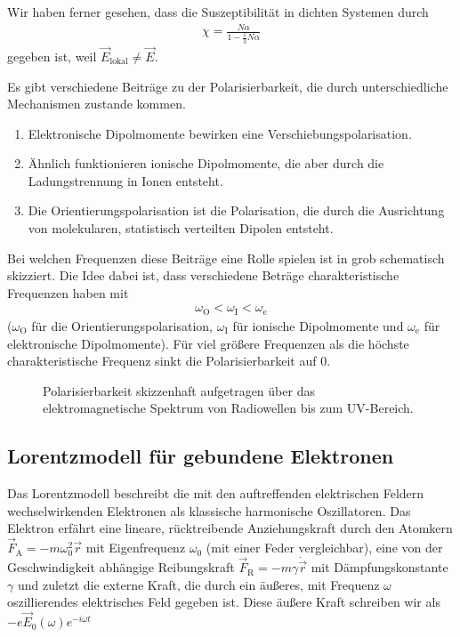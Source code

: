 Wir haben ferner gesehen, dass die Suszeptibilität in dichten Systemen durch
\begin{align*}
    \chi =\frac{N\alpha}{1-\frac{1}{3}N\alpha}
\end{align*}
gegeben ist, weil $\vec E_\mathrm{lokal}\neq\vec E$.

Es gibt verschiedene Beiträge zu der Polarisierbarkeit, die durch unterschiedliche Mechanismen zustande kommen.
\begin{enumerate}
    \item Elektronische Dipolmomente bewirken eine Verschiebungspolarisation.
    \item Ähnlich funktionieren ionische Dipolmomente, die aber durch die Ladungstrennung in Ionen entsteht.
    \item Die Orientierungspolarisation ist die Polarisation, die durch die Ausrichtung von molekularen, statistisch verteilten Dipolen entsteht.
\end{enumerate}

Bei welchen Frequenzen diese Beiträge eine Rolle spielen ist in  grob schematisch skizziert.
Die Idee dabei ist, dass verschiedene Beträge charakteristische Frequenzen haben mit
\begin{align*}
    \omega_\mathrm{O}<\omega_\mathrm{I}<\omega_\mathrm{e}
\end{align*}
($\omega_\mathrm{O}$ für die Orientierungspolarisation, $\omega_\mathrm{I}$ für ionische Dipolmomente und $\omega_\mathrm{e}$ für elektronische Dipolmomente).
Für viel größere Frequenzen als die höchste charakteristische Frequenz sinkt die Polarisierbarkeit auf $0$.

\begin{figure}[htb]
    \centering
    \tfigPolarizabilityOverSpectrum
    \caption{Polarisierbarkeit skizzenhaft aufgetragen über das elektromagnetische Spektrum von Radiowellen bis zum UV-Bereich. }
    \label{fig:polarisierbarkeit_ueber_spektrum}
\end{figure}



\subsection{Lorentzmodell für gebundene Elektronen\label{sec:lorentzmodell_gebundene_elektronen}}

Das Lorentzmodell beschreibt die mit den auftreffenden elektrischen Feldern wechselwirkenden Elektronen als klassische harmonische Oszillatoren.
Das Elektron erfährt eine lineare, rücktreibende Anziehungskraft durch den Atomkern $\vec F_\mathrm{A} = -m\omega_0^2 \vec r$ mit Eigenfrequenz $\omega_0$ (mit einer Feder vergleichbar),
eine von der Geschwindigkeit abhängige Reibungskraft $\vec F_\mathrm{R}=-m\gamma\dot{\vec r}$ mit Dämpfungskonstante $\gamma$ und zuletzt die externe Kraft, die durch ein äußeres, mit Frequenz $\omega$ oszillierendes elektrisches Feld gegeben ist.
Diese äußere Kraft schreiben wir als $-e\vec E_0(\omega)e^{-i\omega t}$

